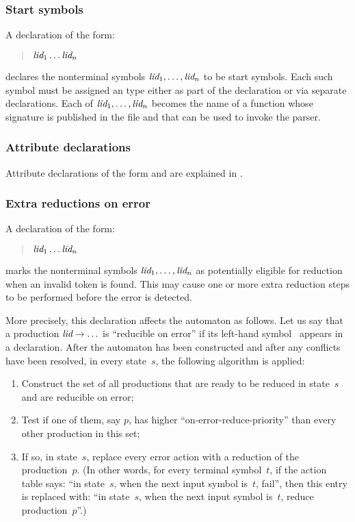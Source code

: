\documentclass[onecolumn,11pt,nocopyrightspace,preprint]{sigplanconf}
\begin{document}

\subsubsection{Start symbols}
\label{sec:start}

A declaration of the form:
\begin{quote}
\dstart \optional{\ocamltype} $\textit{lid}_1 \ldots \textit{lid}_n$
\end{quote}
declares the nonterminal symbols $\textit{lid}_1, \ldots, \textit{lid}_n$ to be
start symbols. Each such symbol must be assigned an \ocaml type either as
part of the \dstart declaration or via separate \dtype declarations. Each
of $\textit{lid}_1, \ldots, \textit{lid}_n$ becomes the name of a function whose
signature is published in the \mli file and that can be used to invoke
the parser.

\subsubsection{Attribute declarations}

Attribute declarations
of the form
\dattribute {} 
and
\kw{\%} 
are explained
in .

\subsubsection{Extra reductions on error}
\label{sec:onerrorreduce}

A declaration of the form:
\begin{quote}
\donerrorreduce $\textit{lid}_1 \ldots \textit{lid}_n$
\end{quote}
marks the nonterminal symbols $\textit{lid}_1, \ldots, \textit{lid}_n$ as
potentially eligible for reduction when an invalid token is found.
This may cause one or more extra reduction steps to be performed
before the error is detected.

More precisely, this declaration affects the automaton as follows. Let us say
that a production $\textit{lid} \rightarrow \ldots$ is ``reducible on error'' if
its left-hand symbol~ appears in a \donerrorreduce declaration. After
the automaton has been constructed and after any conflicts have been resolved,
in every state~$s$, the following algorithm is applied:
\begin{enumerate}
\item Construct the set of all productions that are ready to be reduced in
  state~$s$ and are reducible on error;
\item Test if one of them, say $p$, has higher ``on-error-reduce-priority''
  than every other production in this set;
\item If so, in state~$s$, replace every error action with a reduction of the
  production~$p$.
(In other words, for every terminal symbol~$t$, if the action table
says: ``in state~$s$, when the next input symbol is~$t$, fail'', then this
entry is replaced with: ``in state~$s$, when the next input symbol
is~$t$, reduce production~$p$''.)
\end{enumerate}
\end{document}
